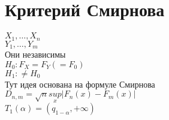 \documentclass{article}
\newcommand\0{\mathbb{0}}
\newcommand\1{\mathbb{1}}
\begin{document}
\section{Критерий Смирнова}
$X_1, \dots, X_n$\\
$Y_1, \dots, Y_m$\\
Они независимы\\
$H_0: F_X = F_Y (= F_0)$\\
$H_1: \neq H_0$\\
Тут идея основана на формуле Смирнова\\
$D_{n, m} = \sqrt{n}\underset{x}{sup}|F_n(x) - F_m(x)|$\\
$T_1(\alpha) = (q_{1 - \alpha}, +\infty)$
\end{document}
